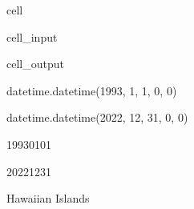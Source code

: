 \documentclass[letterpaper,10pt,english]{jupyterBook}
\begin{document}
\begin{sphinxuseclass}{cell}
\begin{sphinxVerbatimInput}
\begin{sphinxuseclass}{cell_input}
\begin{sphinxVerbatim}[commandchars=\\\{\}]
\end{sphinxVerbatim}

\end{sphinxuseclass}\end{sphinxVerbatimInput}
\begin{sphinxVerbatimOutput}

\begin{sphinxuseclass}{cell_output}
\begin{sphinxVerbatim}[commandchars=\\\{\}]
datetime.datetime(1993, 1, 1, 0, 0)
\end{sphinxVerbatim}

\begin{sphinxVerbatim}[commandchars=\\\{\}]
datetime.datetime(2022, 12, 31, 0, 0)
\end{sphinxVerbatim}

\begin{sphinxVerbatim}[commandchars=\\\{\}]
\PYGZsq{}1993\PYGZhy{}01\PYGZhy{}01\PYGZsq{}
\end{sphinxVerbatim}

\begin{sphinxVerbatim}[commandchars=\\\{\}]
\PYGZsq{}2022\PYGZhy{}12\PYGZhy{}31\PYGZsq{}
\end{sphinxVerbatim}

\begin{sphinxVerbatim}[commandchars=\\\{\}]
\PYGZsq{}Hawaiian Islands\PYGZsq{}
\end{sphinxVerbatim}

\end{sphinxuseclass}\end{sphinxVerbatimOutput}

\end{sphinxuseclass}
\end{document}
